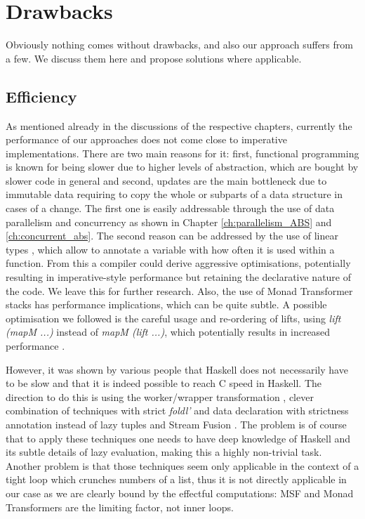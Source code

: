 \section{Drawbacks}
\label{sec:drawbacks}
Obviously nothing comes without drawbacks, and also our approach suffers from a few. We discuss them here and propose solutions where applicable.

\subsection{Efficiency}
\label{sec:drawback_efficiency}
As mentioned already in the discussions of the respective chapters, currently the performance of our approaches does not come close to imperative implementations. There are two main reasons for it: first, functional programming is known for being slower due to higher levels of abstraction, which are bought by slower code in general and second, updates are the main bottleneck due to immutable data requiring to copy the whole or subparts of a data structure in cases of a change. The first one is easily addressable through the use of data parallelism and concurrency as shown in Chapter \ref{ch:parallelism_ABS} and \ref{ch:concurrent_abs}. The second reason can be addressed by the use of linear types \cite{bernardy_linear_2017}, which allow to annotate a variable with how often it is used within a function. From this a compiler could derive aggressive optimisations, potentially resulting in imperative-style performance but retaining the declarative nature of the code. We leave this for further research. Also, the use of Monad Transformer stacks has performance implications, which can be quite subtle. A possible optimisation we followed is the careful usage and re-ordering of lifts, using \textit{lift (mapM ...)} instead of \textit{mapM (lift ...)}, which potentially results in increased performance .

However, it was shown by various people \cite{kqr_competing_2017, stewart_haskell_2008, stolarek_haskell_2013} that Haskell does not necessarily have to be slow and that it is indeed possible to reach C speed in Haskell. The direction to do this is using the worker/wrapper transformation \cite{gill_worker/wrapper_2009}, clever combination of techniques with strict \textit{foldl'} and data declaration with strictness annotation instead of lazy tuples and Stream Fusion \cite{coutts_stream_2007, mainland_haskell_2013}. The problem is of course that to apply these techniques one needs to have deep knowledge of Haskell and its subtle details of lazy evaluation, making this a highly non-trivial task. Another problem is that those techniques seem only applicable in the context of a tight loop which crunches numbers of a list, thus it is not directly applicable in our case as we are clearly bound by the effectful computations: MSF and Monad Transformers are the limiting factor, not inner loops.

